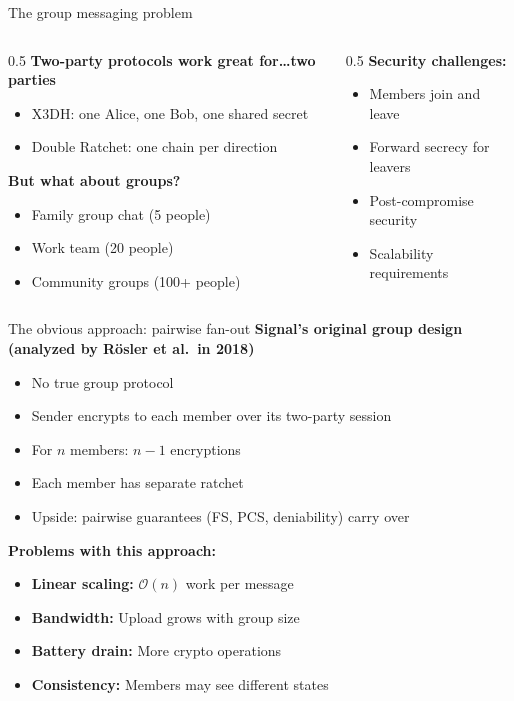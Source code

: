 \ifdefined\PRESENTATION\else\PassOptionsToClass{handout}{beamer}\fi\documentclass[aspectratio=169, lualatex]{beamer}
\begin{document}
\begin{frame}{The group messaging problem}
	\begin{columns}[c]
		\begin{column}{0.5\textwidth}
			\textbf{Two-party protocols work great for\ldots two parties}
			\begin{itemize}
				\item X3DH: one Alice, one Bob, one shared secret
				\item Double Ratchet: one chain per direction
			\end{itemize}
			\textbf{But what about groups?}
			\begin{itemize}
				\item Family group chat (5 people)
				\item Work team (20 people)
				\item Community groups (100+ people)
			\end{itemize}
		\end{column}
		\begin{column}{0.5\textwidth}
			\textbf{Security challenges:}
			\begin{itemize}
				\item Members join and leave
				\item Forward secrecy for leavers
				\item Post-compromise security
				\item Scalability requirements
			\end{itemize}
		\end{column}
	\end{columns}
\end{frame}

\begin{frame}{The obvious approach: pairwise fan-out}
	\textbf{Signal's original group design (analyzed by R\"osler et al.\ in 2018)}
	\begin{itemize}
		\item No true group protocol
		\item Sender encrypts to each member over its two-party session
		\item For $n$ members: $n-1$ encryptions
		\item Each member has separate ratchet
		\item Upside: pairwise guarantees (FS, PCS, deniability) carry over
	\end{itemize}
	\textbf{Problems with this approach:}
	\begin{itemize}
		\item \textbf{Linear scaling:} $\mathcal{O}(n)$ work per message
		\item \textbf{Bandwidth:} Upload grows with group size
		\item \textbf{Battery drain:} More crypto operations
		\item \textbf{Consistency:} Members may see different states
	\end{itemize}
\end{frame}
\end{document}
